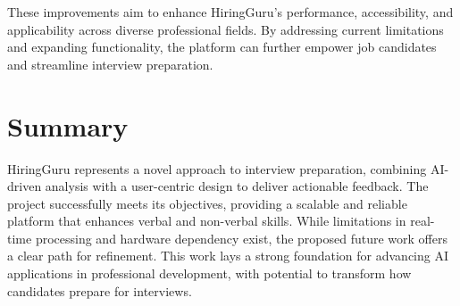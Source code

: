These improvements aim to enhance HiringGuru’s performance, accessibility, and applicability across diverse professional fields. By addressing current limitations and expanding functionality, the platform can further empower job candidates and streamline interview preparation.

\section{Summary}
HiringGuru represents a novel approach to interview preparation, combining AI-driven analysis with a user-centric design to deliver actionable feedback. The project successfully meets its objectives, providing a scalable and reliable platform that enhances verbal and non-verbal skills. While limitations in real-time processing and hardware dependency exist, the proposed future work offers a clear path for refinement. This work lays a strong foundation for advancing AI applications in professional development, with potential to transform how candidates prepare for interviews.